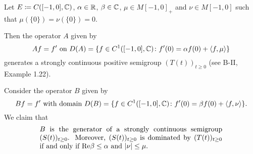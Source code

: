 \begin{example}\label{ex:c2-4.14}
Let $E \coloneq C([-1,0],\mathbb{C})$, $\alpha \in \mathbb{R}$, $\beta \in \mathbb{C}$, $\mu \in M[-1,0]_{+}$
and $\nu \in M[-1,0]$ such that $\mu(\{0\}) = \nu(\{0\}) = 0$.

Then the operator $A$ given by 
\[
Af = f' \text{ on } D(A) = \{f \in C^{1}([-1,0],\mathbb{C}) \colon f'(0) = \alpha f(0) + \langle f,\mu\rangle\}
\]
generates a strongly continuous positive semigroup $(T(t))_{t \geq 0}$ 
(see B-II, Example 1.22).

Consider the operator $B$ given by
\[Bf = f' \text{ with domain } D(B) = \{f \in C^{1}([-1,0],\mathbb{C}) \colon f'(0) = \beta f(0) + \langle f,\nu \rangle\}.
\]
We claim that
\begin{equation}\label{eq:c2-4.13}
\begin{minipage}{.75\textwidth}
$ B $ is the generator of a strongly continuous semigroup  $(S(t))_{t \geq 0}$.
Moreover,  $(S(t))_{t \geq 0}$ is dominated by  $(T(t))_{t \geq 0}$ 
if and only if $\Re\beta \leq \alpha$ and  $|\nu| \leq \mu$.
\end{minipage}
\end{equation}
\end{example}
